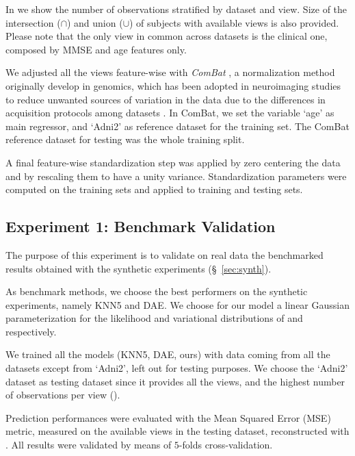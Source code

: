 In  we show the number of observations stratified by dataset and view.
Size of the intersection ($\cap$) and union ($\cup$) of subjects with available views is also provided.
Please note that the only view in common across datasets is the clinical one, composed by MMSE and age features only.

We adjusted all the views feature-wise with \textit{ComBat} \citep{combat}, a normalization method originally develop in genomics, which has been adopted in neuroimaging studies to reduce unwanted sources of variation in the data due to the differences in acquisition protocols among datasets \citep{Fortin2017, Fortin2018, Orlhac2020}.
In ComBat, we set the variable `age' as main regressor, and `Adni2' as reference dataset for the training set.
The ComBat reference dataset for testing was the whole training split.

A final feature-wise standardization step was applied by zero centering the data and by rescaling them to have a unity variance.
Standardization parameters were computed on the training sets and applied to training and testing sets.

\subsection{Experiment 1: Benchmark Validation}


The purpose of this experiment is to validate on real data the benchmarked results obtained with the synthetic experiments (\S~\ref{sec:synth}).

As benchmark methods, we choose the best performers on the synthetic experiments, namely KNN5 and DAE.
We choose for our model a linear Gaussian parameterization for the likelihood and variational distributions of  and  respectively.

We trained all the models (KNN5, DAE, ours) with data coming from all the datasets except from `Adni2', left out for testing purposes.
We choose the `Adni2' dataset as testing dataset since it provides all the views, and the highest number of observations per view ().

Prediction performances were evaluated with the Mean Squared Error (MSE) metric, measured on the available views in the testing dataset, reconstructed with .
All results were validated by means of $5$-folds cross-validation.

